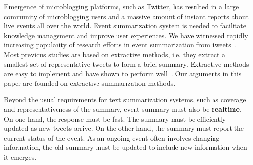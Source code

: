 \documentclass[envcountsame]{llncs}
\begin{document}
Emergence of microblogging platforms, such as Twitter, has resulted in a large community of microblogging users and a massive amount of instant reports about live events all over the world.  Event summarization system is needed to facilitate knowledge management and improve user experiences. We have witnessed rapidly increasing popularity of research efforts in event summarization from tweets~\cite{Takamura2011Summarizing,Lin2012Generating,Rudra2015Extracting,Shou2013Sumblr,Liu2016LEDS,Gillani2017Post,Zubiaga2012Towards,Sharifi2010Summarizing}.   Most previous studies are based on extractive methods, i.e. they extract a smallest set of representative tweets to form a brief summary. Extractive methods are easy to implement and have shown to perform well~\cite{Takamura2011Summarizing,Lin2012Generating,Rudra2015Extracting,Shou2013Sumblr,Liu2016LEDS,Gillani2017Post,Zubiaga2012Towards}. Our arguments in this paper are founded on extractive summarization methods.

Beyond the usual requirements for text summarization systems, such as coverage and representativeness of the summary,  event summary must also be \textbf{realtime}. On one hand, the response must be fast. The summary must be efficiently updated as new tweets arrive. On the other hand, the summary must report the current status of the event. As an ongoing event often involves changing information, the old summary must be updated to include new information when it emerges.
\end{document}
